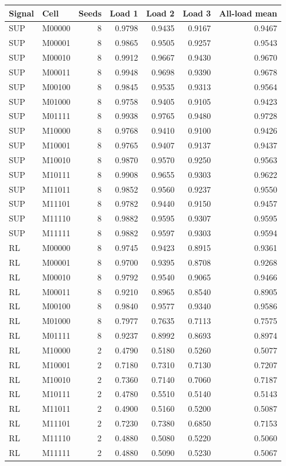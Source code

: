 \documentclass[
  10pt,
]{article}
\begin{document}
\begin{longtable}[]{@{}llrrrrr@{}}
\toprule\noalign{}
Signal & Cell & Seeds & Load 1 & Load 2 & Load 3 & All-load mean \\
\midrule\noalign{}
\endhead
\bottomrule\noalign{}
\endlastfoot
SUP & M00000 & 8 & 0.9798 & 0.9435 & 0.9167 & 0.9467 \\
SUP & M00001 & 8 & 0.9865 & 0.9505 & 0.9257 & 0.9543 \\
SUP & M00010 & 8 & 0.9912 & 0.9667 & 0.9430 & 0.9670 \\
SUP & M00011 & 8 & 0.9948 & 0.9698 & 0.9390 & 0.9678 \\
SUP & M00100 & 8 & 0.9845 & 0.9535 & 0.9313 & 0.9564 \\
SUP & M01000 & 8 & 0.9758 & 0.9405 & 0.9105 & 0.9423 \\
SUP & M01111 & 8 & 0.9938 & 0.9765 & 0.9480 & 0.9728 \\
SUP & M10000 & 8 & 0.9768 & 0.9410 & 0.9100 & 0.9426 \\
SUP & M10001 & 8 & 0.9765 & 0.9407 & 0.9137 & 0.9437 \\
SUP & M10010 & 8 & 0.9870 & 0.9570 & 0.9250 & 0.9563 \\
SUP & M10111 & 8 & 0.9908 & 0.9655 & 0.9303 & 0.9622 \\
SUP & M11011 & 8 & 0.9852 & 0.9560 & 0.9237 & 0.9550 \\
SUP & M11101 & 8 & 0.9782 & 0.9440 & 0.9150 & 0.9457 \\
SUP & M11110 & 8 & 0.9882 & 0.9595 & 0.9307 & 0.9595 \\
SUP & M11111 & 8 & 0.9882 & 0.9597 & 0.9303 & 0.9594 \\
RL & M00000 & 8 & 0.9745 & 0.9423 & 0.8915 & 0.9361 \\
RL & M00001 & 8 & 0.9700 & 0.9395 & 0.8708 & 0.9268 \\
RL & M00010 & 8 & 0.9792 & 0.9540 & 0.9065 & 0.9466 \\
RL & M00011 & 8 & 0.9210 & 0.8965 & 0.8540 & 0.8905 \\
RL & M00100 & 8 & 0.9840 & 0.9577 & 0.9340 & 0.9586 \\
RL & M01000 & 8 & 0.7977 & 0.7635 & 0.7113 & 0.7575 \\
RL & M01111 & 8 & 0.9237 & 0.8992 & 0.8693 & 0.8974 \\
RL & M10000 & 2 & 0.4790 & 0.5180 & 0.5260 & 0.5077 \\
RL & M10001 & 2 & 0.7180 & 0.7310 & 0.7130 & 0.7207 \\
RL & M10010 & 2 & 0.7360 & 0.7140 & 0.7060 & 0.7187 \\
RL & M10111 & 2 & 0.4780 & 0.5510 & 0.5140 & 0.5143 \\
RL & M11011 & 2 & 0.4900 & 0.5160 & 0.5200 & 0.5087 \\
RL & M11101 & 2 & 0.7230 & 0.7380 & 0.6850 & 0.7153 \\
RL & M11110 & 2 & 0.4880 & 0.5080 & 0.5220 & 0.5060 \\
RL & M11111 & 2 & 0.4880 & 0.5090 & 0.5230 & 0.5067 \\
\end{longtable}
\end{document}
